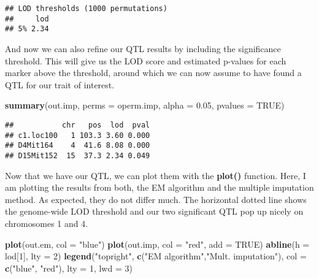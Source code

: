 \documentclass[12pt,]{book}
\newenvironment{Shaded}{\begin{snugshade}}{\end{snugshade}}
\newcommand{\KeywordTok}[1]{\textcolor[rgb]{0.27,0.27,0.27}{\textbf{{#1}}}}
\newcommand{\DataTypeTok}[1]{\textcolor[rgb]{0.27,0.27,0.27}{{#1}}}
\newcommand{\DecValTok}[1]{\textcolor[rgb]{0.06,0.06,0.06}{{#1}}}
\newcommand{\FloatTok}[1]{\textcolor[rgb]{0.06,0.06,0.06}{{#1}}}
\newcommand{\StringTok}[1]{\textcolor[rgb]{0.5,0.5,0.5}{{#1}}}
\newcommand{\OtherTok}[1]{\textcolor[rgb]{0.37,0.37,0.37}{{#1}}}
\newcommand{\NormalTok}[1]{{#1}}
\begin{document}
\begin{verbatim}
## LOD thresholds (1000 permutations)
##     lod
## 5% 2.34
\end{verbatim}

And now we can also refine our QTL results by including the significance
threshold. This will give us the LOD score and estimated p-values for
each marker above the threshold, around which we can now assume to have
found a QTL for our trait of interest.

\begin{Shaded}
\begin{Highlighting}[]
\KeywordTok{summary}\NormalTok{(out.imp, }\DataTypeTok{perms =} \NormalTok{operm.imp, }\DataTypeTok{alpha =} \FloatTok{0.05}\NormalTok{, }\DataTypeTok{pvalues =} \OtherTok{TRUE}\NormalTok{)}
\end{Highlighting}
\end{Shaded}

\begin{verbatim}
##           chr   pos  lod  pval
## c1.loc100   1 103.3 3.60 0.000
## D4Mit164    4  41.6 8.08 0.000
## D15Mit152  15  37.3 2.34 0.049
\end{verbatim}

Now that we have our QTL, we can plot them with the \textbf{plot()}
function. Here, I am plotting the results from both, the EM algorithm
and the multiple imputation method. As expected, they do not differ
much. The horizontal dotted line shows the genome-wide LOD threshold and
our two significant QTL pop up nicely on chromosomes 1 and 4.

\begin{Shaded}
\begin{Highlighting}[]
\KeywordTok{plot}\NormalTok{(out.em, }\DataTypeTok{col =} \StringTok{"blue"}\NormalTok{)}
\KeywordTok{plot}\NormalTok{(out.imp, }\DataTypeTok{col =} \StringTok{"red"}\NormalTok{, }\DataTypeTok{add =} \OtherTok{TRUE}\NormalTok{)}
\KeywordTok{abline}\NormalTok{(}\DataTypeTok{h =} \NormalTok{lod[}\DecValTok{1}\NormalTok{], }\DataTypeTok{lty =} \DecValTok{2}\NormalTok{)}
\KeywordTok{legend}\NormalTok{(}\StringTok{"topright"}\NormalTok{, }\KeywordTok{c}\NormalTok{(}\StringTok{"EM algorithm"}\NormalTok{,}\StringTok{"Mult. imputation"}\NormalTok{), }\DataTypeTok{col =} \KeywordTok{c}\NormalTok{(}\StringTok{"blue"}\NormalTok{, }\StringTok{"red"}\NormalTok{), }\DataTypeTok{lty =} \DecValTok{1}\NormalTok{, }\DataTypeTok{lwd =} \DecValTok{3}\NormalTok{)}
\end{Highlighting}
\end{Shaded}
\end{document}
